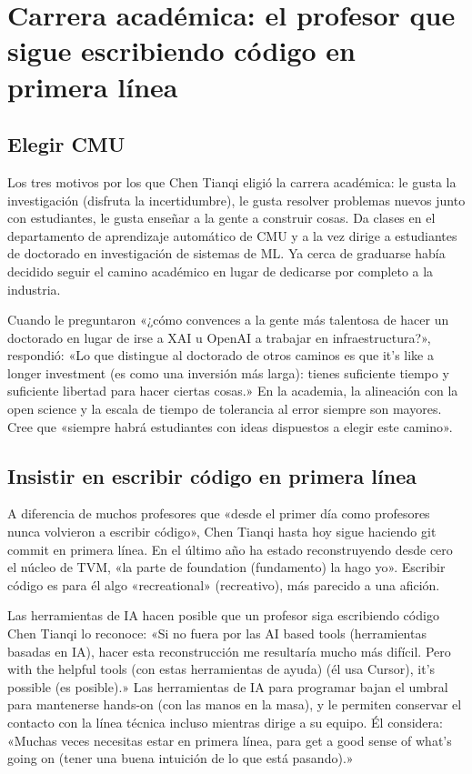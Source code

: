 \section{Carrera académica: el profesor que sigue escribiendo código en primera línea}

\subsection{Elegir CMU}

Los tres motivos por los que Chen Tianqi eligió la carrera académica: le gusta la investigación (disfruta la incertidumbre), le gusta resolver problemas nuevos junto con estudiantes, le gusta enseñar a la gente a construir cosas. Da clases en el departamento de aprendizaje automático de CMU y a la vez dirige a estudiantes de doctorado en investigación de sistemas de ML. Ya cerca de graduarse había decidido seguir el camino académico en lugar de dedicarse por completo a la industria.

Cuando le preguntaron «¿cómo convences a la gente más talentosa de hacer un doctorado en lugar de irse a XAI u OpenAI a trabajar en infraestructura?», respondió: «Lo que distingue al doctorado de otros caminos es que it's like a longer investment (es como una inversión más larga): tienes suficiente tiempo y suficiente libertad para hacer ciertas cosas.» En la academia, la alineación con la open science y la escala de tiempo de tolerancia al error siempre son mayores. Cree que «siempre habrá estudiantes con ideas dispuestos a elegir este camino».

\subsection{Insistir en escribir código en primera línea}

A diferencia de muchos profesores que «desde el primer día como profesores nunca volvieron a escribir código», Chen Tianqi hasta hoy sigue haciendo git commit en primera línea. En el último año ha estado reconstruyendo desde cero el núcleo de TVM, «la parte de foundation (fundamento) la hago yo». Escribir código es para él algo «recreational» (recreativo), más parecido a una afición.

\begin{knowledgebox}{Las herramientas de IA hacen posible que un profesor siga escribiendo código}
Chen Tianqi lo reconoce: «Si no fuera por las AI based tools (herramientas basadas en IA), hacer esta reconstrucción me resultaría mucho más difícil. Pero with the helpful tools (con estas herramientas de ayuda) (él usa Cursor), it's possible (es posible).» Las herramientas de IA para programar bajan el umbral para mantenerse hands-on (con las manos en la masa), y le permiten conservar el contacto con la línea técnica incluso mientras dirige a su equipo. Él considera: «Muchas veces necesitas estar en primera línea, para get a good sense of what's going on (tener una buena intuición de lo que está pasando).»
\end{knowledgebox}

